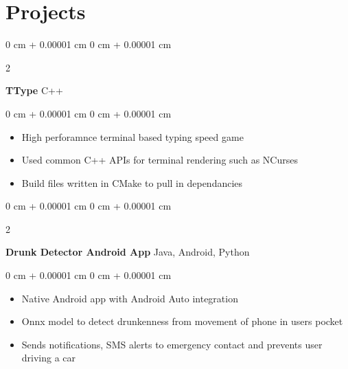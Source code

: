 \documentclass[10pt, letterpaper]{article}
\newenvironment{highlights}{
    \begin{itemize}[
        topsep=0.10 cm,
        parsep=0.10 cm,
        partopsep=0pt,
        itemsep=0pt,
        leftmargin=0 cm + 10pt
    ]
}{
    \end{itemize}
} %
\newenvironment{onecolentry}{
    \begin{adjustwidth}{
        0 cm + 0.00001 cm
    }{
        0 cm + 0.00001 cm
    }
}{
    \end{adjustwidth}
} %
\newenvironment{twocolentry}[2][]{
    \onecolentry
    \def\secondColumn{#2}
    \setcolumnwidth{\fill, 4.5 cm}
    \begin{paracol}{2}
}{
    \switchcolumn \raggedleft \secondColumn
    \end{paracol}
    \endonecolentry
} %
\begin{document}
    \section{Projects}

    \begin{twocolentry}{
        C++
    }
        \textbf{TType}\end{twocolentry}
    \vspace{0.10 cm}
    \begin{onecolentry}
        \begin{highlights}
            \item High perforamnce terminal based typing speed game
            \item Used common C++ APIs for terminal rendering such as NCurses
            \item Build files written in CMake to pull in dependancies
        \end{highlights}
    \end{onecolentry}
    \vspace{0.2 cm}

    \begin{twocolentry}{
        Java, Android, Python
    }
        \textbf{Drunk Detector Android App}\end{twocolentry}
    \vspace{0.10 cm}
    \begin{onecolentry}
        \begin{highlights}
            \item Native Android app with Android Auto integration
            \item Onnx model to detect drunkenness from movement of phone in users pocket
            \item Sends notifications, SMS alerts to emergency contact and prevents user driving a car
        \end{highlights}
    \end{onecolentry}

\end{document}
